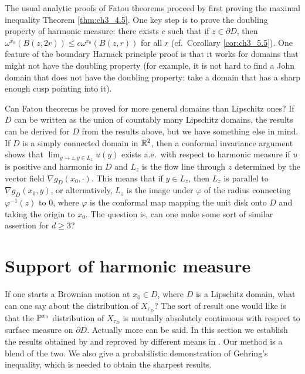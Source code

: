 \mnewpage

The usual analytic proofs of Fatou theorems proceed by first proving the maximal inequality Theorem \ref{thm:ch3_4.5}. One key step is to prove the doubling property of harmonic measure: there exists $c$ such that if $z \in \partial D$, then $\omega^{x_0}(B(z,2r)) \leq c\omega^{x_0}(B(z,r))$ for all $r$ (cf.\ Corollary \ref{cor:ch3_5.5}). One feature of the boundary Harnack principle proof is that it works for domains that might not have the doubling property (for example, it is not hard to find a John domain that does not have the doubling property: take a domain that has a sharp enough cusp pointing into it).

Can Fatou theorems be proved for more general domains than Lipschitz ones? If $D$ can be written as the union of countably many Lipschitz domains, the results can be derived for $D$ from the results above, but we have something else in mind. If $D$ is a simply connected domain in $\R^2$, then a conformal invariance argument shows that $\lim_{y \to z,y \in L_z} u(y)$ exists a.e.\ with respect to harmonic measure if $u$ is positive and harmonic in $D$ and $L_z$ is the flow line through $z$ determined by the vector field $\nabla g_D(x_0,\cdot)$. This means that if $y \in L_z$, then $L_z$ is parallel to $\nabla g_D(x_0,y)$, or alternatively, $L_z$ is the image under $\varphi$ of the radius connecting $\varphi^{-1}(z)$ to $0$, where $\varphi$ is the conformal map mapping the unit disk onto $D$ and taking the origin to $x_0$. The question is, can one make some sort of similar assertion for $d \geq 3$?

\section{Support of harmonic measure}\label{ch3_sec5}


If one starts a Brownian motion at $x_0 \in D$, where $D$ is a Lipschitz domain, what can one say about the distribution of $X_{\tau_D}$? The sort of result one would like is that the $\P^{x_0}$ distribution of $X_{\tau_D}$ is mutually absolutely continuous with respect to surface measure on $\partial D$. Actually more can be said. In this section we establish the results obtained by \cite{Dahlberg1977} and reproved by different means in \cite{JerisonKenig1982a}. Our method is a blend of the two. We also give a probabilistic demonstration of Gehring's inequality, which is needed to obtain the sharpest results.

